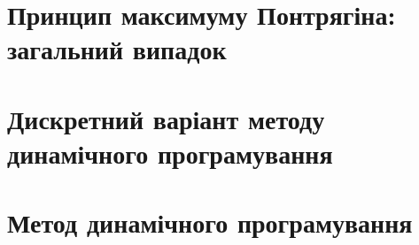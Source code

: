 \documentclass[a5paper, 10pt]{article}
\theoremstyle{definition}
\numberwithin{equation}{section}
\begin{document}
\section{Принцип максимуму Понтрягіна: загальний випадок}

 \newpage
 \newpage
 \newpage

\section{Дискретний варіант методу динамічного програмування}

 \newpage
 \newpage
 \newpage

\section{Метод динамічного програмування}

 \newpage
 \newpage

\end{document}
